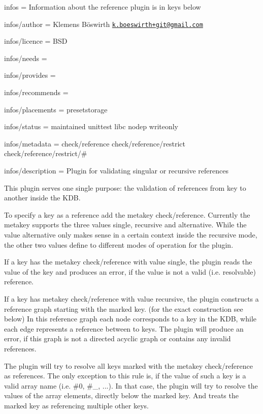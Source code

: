 
\begin{DoxyItemize}
\item infos = Information about the reference plugin is in keys below
\item infos/author = Klemens Böswirth \href{mailto:k.boeswirth+git@gmail.com}{\tt k.\+boeswirth+git@gmail.\+com}
\item infos/licence = B\+SD
\item infos/needs =
\item infos/provides =
\item infos/recommends =
\item infos/placements = presetstorage
\item infos/status = maintained unittest libc nodep writeonly
\item infos/metadata = check/reference check/reference/restrict check/reference/restrict/\#
\item infos/description = Plugin for validating singular or recursive references
\end{DoxyItemize}

This plugin serves one single purpose\+: the validation of references from key to another inside the K\+DB.

To specify a key as a reference add the metakey {\ttfamily check/reference}. Currently the metakey supports the three values {\ttfamily single}, {\ttfamily recursive} and {\ttfamily alternative}. While the value {\ttfamily alternative} only makes sense in a certain context inside the {\ttfamily recursive} mode, the other two values define to different modes of operation for the plugin.

If a key has the metakey {\ttfamily check/reference} with value {\ttfamily single}, the plugin reads the value of the key and produces an error, if the value is not a valid (i.\+e. resolvable) reference.

If a key has metakey {\ttfamily check/reference} with value {\ttfamily recursive}, the plugin constructs a reference graph starting with the marked key. (for the exact construction see below) In this reference graph each node corresponds to a key in the K\+DB, while each edge represents a reference between to keys. The plugin will produce an error, if this graph is not a directed acyclic graph or contains any invalid references.

The plugin will try to resolve all keys marked with the metakey {\ttfamily check/reference} as references. The only exception to this rule is, if the value of such a key is a valid array name (i.\+e. {\ttfamily \#0}, {\ttfamily \#\+\_}, ...). In that case, the plugin will try to resolve the values of the array elements, directly below the marked key. And treats the marked key as referencing multiple other keys.

